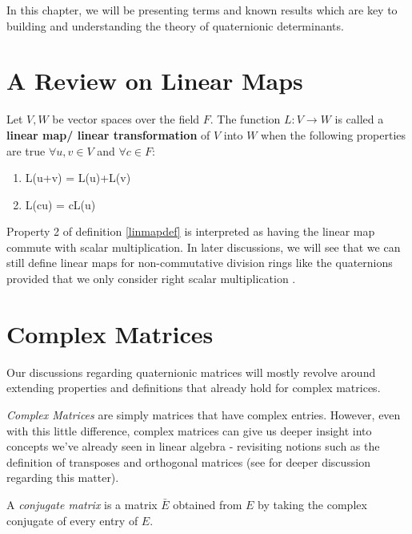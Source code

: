 In this chapter, we will be presenting terms and known results which are key to building and understanding the theory of quaternionic determinants.  

\section{A Review on Linear Maps}

\begin{definition} \label{linmapdef}
	Let $V, W$ be vector spaces over the field $F$. The function $L: V \rightarrow W$ is called a \textbf{linear map/ linear transformation} of $V$ into $W$ when the following properties are true $\forall u,v \in V$ and $\forall c \in F$:
	\begin{enumerate}
		\item L(u+v) = L(u)+L(v)
		\item L(cu) = cL(u)
	\end{enumerate}
\end{definition}

Property 2 of definition \ref{linmapdef} is interpreted as having the linear map commute with scalar multiplication. In later discussions, we will see that we can still define linear maps for non-commutative division rings like the quaternions provided that we only consider right scalar multiplication \cite{stack}.

\section{Complex Matrices}

Our discussions regarding quaternionic matrices will mostly revolve around extending properties and definitions that already hold for complex matrices. 

\emph{Complex Matrices} are simply matrices that have complex entries. However, even with this little difference, complex matrices can give us deeper insight into concepts we've already seen in linear algebra - revisiting notions such as the definition of transposes and orthogonal matrices (see \cite{stamaria} for deeper discussion regarding this matter). 

\begin{definition}
	A \emph{conjugate matrix} is a matrix $\bar{E}$ obtained from $E$ by taking the complex conjugate of every entry of $E$.
\end{definition}

